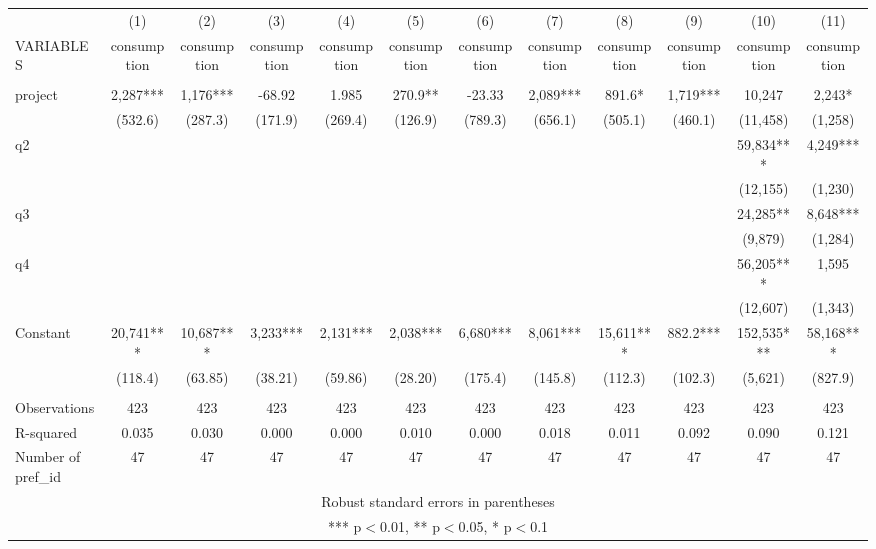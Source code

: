 \documentclass[]{article}
\begin{document}
\begin{tabular}{lccccccccccc} \hline
 & (1) & (2) & (3) & (4) & (5) & (6) & (7) & (8) & (9) & (10) & (11) \\
VARIABLES & consumption & consumption & consumption & consumption & consumption & consumption & consumption & consumption & consumption & consumption & consumption \\ \hline
 &  &  &  &  &  &  &  &  &  &  &  \\
project & 2,287*** & 1,176*** & -68.92 & 1.985 & 270.9** & -23.33 & 2,089*** & 891.6* & 1,719*** & 10,247 & 2,243* \\
 & (532.6) & (287.3) & (171.9) & (269.4) & (126.9) & (789.3) & (656.1) & (505.1) & (460.1) & (11,458) & (1,258) \\
q2 &  &  &  &  &  &  &  &  &  & 59,834*** & 4,249*** \\
 &  &  &  &  &  &  &  &  &  & (12,155) & (1,230) \\
q3 &  &  &  &  &  &  &  &  &  & 24,285** & 8,648*** \\
 &  &  &  &  &  &  &  &  &  & (9,879) & (1,284) \\
q4 &  &  &  &  &  &  &  &  &  & 56,205*** & 1,595 \\
 &  &  &  &  &  &  &  &  &  & (12,607) & (1,343) \\
Constant & 20,741*** & 10,687*** & 3,233*** & 2,131*** & 2,038*** & 6,680*** & 8,061*** & 15,611*** & 882.2*** & 152,535*** & 58,168*** \\
 & (118.4) & (63.85) & (38.21) & (59.86) & (28.20) & (175.4) & (145.8) & (112.3) & (102.3) & (5,621) & (827.9) \\
 &  &  &  &  &  &  &  &  &  &  &  \\
Observations & 423 & 423 & 423 & 423 & 423 & 423 & 423 & 423 & 423 & 423 & 423 \\
R-squared & 0.035 & 0.030 & 0.000 & 0.000 & 0.010 & 0.000 & 0.018 & 0.011 & 0.092 & 0.090 & 0.121 \\
 Number of pref\_id & 47 & 47 & 47 & 47 & 47 & 47 & 47 & 47 & 47 & 47 & 47 \\ \hline
\multicolumn{12}{c}{ Robust standard errors in parentheses} \\
\multicolumn{12}{c}{ *** p$<$0.01, ** p$<$0.05, * p$<$0.1} \\
\end{tabular}
\end{document}
